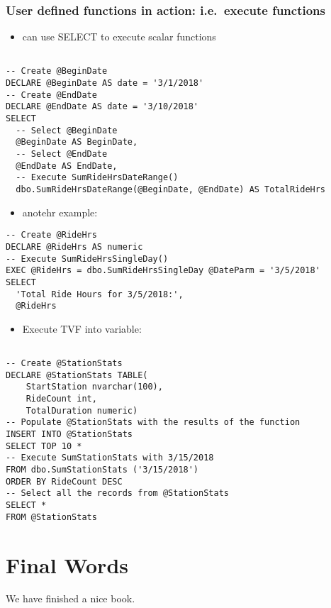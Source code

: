 \documentclass[]{book}
\providecommand{\tightlist}{%
  \setlength{\itemsep}{0pt}\setlength{\parskip}{0pt}}
\begin{document}
\hypertarget{user-defined-functions-in-action-i.e.execute-functions}{%
\subsection{User defined functions in action: i.e.~execute functions}\label{user-defined-functions-in-action-i.e.execute-functions}}

\begin{itemize}
\tightlist
\item
  can use SELECT to execute scalar functions
\end{itemize}

\begin{verbatim}

-- Create @BeginDate
DECLARE @BeginDate AS date = '3/1/2018'
-- Create @EndDate
DECLARE @EndDate AS date = '3/10/2018' 
SELECT
  -- Select @BeginDate
  @BeginDate AS BeginDate,
  -- Select @EndDate
  @EndDate AS EndDate,
  -- Execute SumRideHrsDateRange()
  dbo.SumRideHrsDateRange(@BeginDate, @EndDate) AS TotalRideHrs
\end{verbatim}

\begin{itemize}
\tightlist
\item
  anotehr example:
\end{itemize}

\begin{verbatim}
-- Create @RideHrs
DECLARE @RideHrs AS numeric
-- Execute SumRideHrsSingleDay()
EXEC @RideHrs = dbo.SumRideHrsSingleDay @DateParm = '3/5/2018' 
SELECT 
  'Total Ride Hours for 3/5/2018:', 
  @RideHrs
\end{verbatim}

\begin{itemize}
\tightlist
\item
  Execute TVF into variable:
\end{itemize}

\begin{verbatim}

-- Create @StationStats
DECLARE @StationStats TABLE(
	StartStation nvarchar(100), 
	RideCount int, 
	TotalDuration numeric)
-- Populate @StationStats with the results of the function
INSERT INTO @StationStats
SELECT TOP 10 *
-- Execute SumStationStats with 3/15/2018
FROM dbo.SumStationStats ('3/15/2018') 
ORDER BY RideCount DESC
-- Select all the records from @StationStats
SELECT * 
FROM @StationStats
\end{verbatim}

\hypertarget{final-words}{%
\chapter{Final Words}\label{final-words}}

We have finished a nice book.
\end{document}
